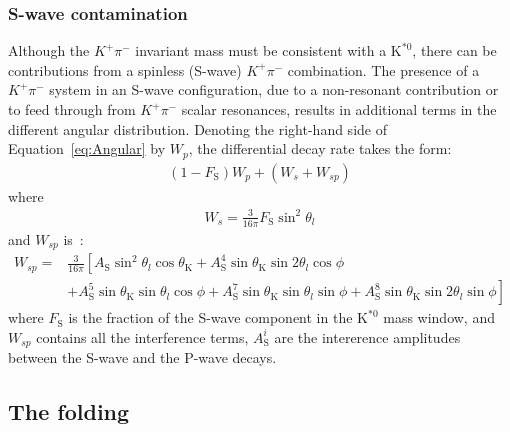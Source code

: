 \subsubsection{S-wave contamination}
\label{sec:S-waveform}

Although the $K^+\pi^-$ invariant mass must be consistent with a $\text{K}^{*0}$, there can be contributions from a spinless (S-wave) $K^+\pi^-$ combination.
The presence of a $K^+\pi^-$ system in an S-wave configuration, due to a non-resonant contribution or to feed through from $K^+\pi^-$ scalar resonances, results in additional terms in the different angular distribution.
Denoting the right-hand side of Equation~\ref{eq:Angular} by $W_p$, the differential decay rate takes the form:
\begin{equation} \label{eq:S-wave}
  \begin{split}
    (1-F_\mathrm{S})W_p + (W_s + W_{sp})
  \end{split}
\end{equation}
where 
\begin{equation} \label{eq:S-wave0}
  \begin{split}
    W_s = \frac{3}{16\pi} F_\mathrm{S}\sin^2\theta_l
  \end{split}
\end{equation}
and $W_{sp}$ is~\cite{Genon:Swave}:
\begin{equation} \label{eq:S-wave1}
  \begin{split}
    W_{sp}= &\frac{3}{16 \pi}\left[ A_\mathrm{S}\sin^2\theta_l\cos\theta_\mathrm{K}+ A_\mathrm{S}^4\sin\theta_\mathrm{K}\sin2\theta_l\cos\phi\right.\\
      &+\left.A^5_\mathrm{S}\sin\theta_\mathrm{K}\sin\theta_l\cos\phi+A_\mathrm{S}^7\sin\theta_\mathrm{K}\sin\theta_l\sin\phi+A_\mathrm{S}^8\sin\theta_\mathrm{K}\sin2\theta_l\sin\phi\right]
  \end{split}
\end{equation}
where $F_\mathrm{S}$ is the fraction of the S-wave component in the $\text{K}^{*0}$ mass window, and $W_{sp}$ contains all the interference terms, $A_\mathrm{S}^i$ are the intererence amplitudes between the S-wave and the P-wave decays\cite{Genon:Swave}.

\subsection{The \pdf folding}
\label{sec:folding}


